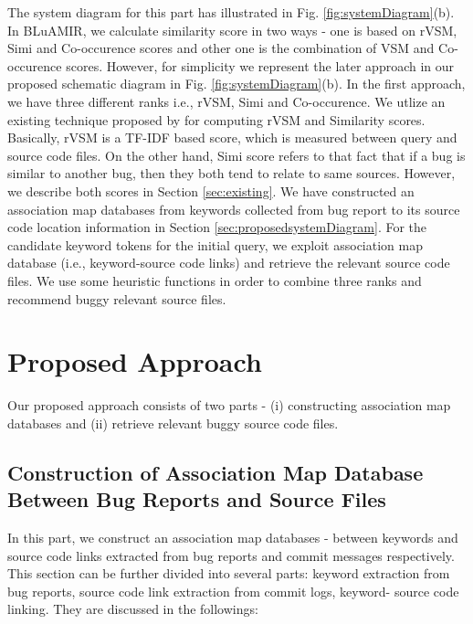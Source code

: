 \documentclass[conference]{IEEEtran}
\begin{document}
The system diagram for this part has illustrated in Fig. \ref{fig:systemDiagram}(b). In BLuAMIR, we calculate similarity score in two ways - one is based on rVSM, Simi and Co-occurence scores and other one is the combination of VSM and Co-occurence scores. However, for simplicity we represent the later approach in our proposed schematic diagram in Fig. \ref{fig:systemDiagram}(b).
In the first approach, we have three different ranks i.e., rVSM, Simi and Co-occurence. We utlize an existing technique proposed by \citet{Jian} for computing rVSM and Similarity scores. Basically, rVSM is a TF-IDF based score, which is measured between query and source code files.
On the other hand, Simi score refers to that fact that if a bug is similar to another bug, then they both tend to relate to same sources. However, we describe both scores in Section \ref{sec:existing}.
We have constructed an association map databases from keywords collected from bug report to its source code location information in Section \ref{sec:proposedsystemDiagram}.
For the candidate keyword tokens for the initial query, we exploit association map database (i.e., keyword-source code links) and retrieve the relevant source code files. We use some heuristic functions in order to combine three ranks and recommend buggy relevant source files. 


\section{Proposed Approach}\label{sec:proposedApproach}
Our proposed approach consists of two parts - (i) constructing association map databases and (ii) retrieve relevant buggy source code files. 

\subsection{Construction of Association Map Database Between Bug Reports and Source Files}
In this part, we construct an association map databases - between keywords and source code links extracted from bug reports and commit messages respectively. This section can be further divided into several parts: keyword extraction from bug reports, source code link extraction from commit logs, keyword- source code linking. They are discussed in the followings:
\end{document}
